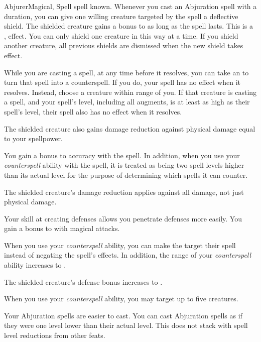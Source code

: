     \begin{feat}{Abjurer}{Magical, Spell}
        \featpre {} spell known.
        \featben
         Whenever you cast an Abjuration spell with a duration, you can give one willing creature targeted by the spell a deflective shield.
        The shielded creature gains a  bonus to  as long as the spell lasts.
        This is a ,  effect.
        You can only shield one creature in this way at a time.
        If you shield another creature, all previous shields are dismissed when the new shield takes effect.

         While you are casting a spell, at any time before it resolves, you can take an  to turn that spell into a counterspell.
        If you do, your spell has no effect when it resolves.
        Instead, choose a creature within \rngmed range of you.
        If that creature is casting a spell, and your spell's level, including all augments, is at least as high as their spell's level, their spell also has no effect when it resolves.

         The shielded creature also gains damage reduction against physical damage equal to your spellpower.

         You gain a  bonus to accuracy with the  spell.
        In addition, when you use your \textit{counterspell} ability with the  spell, it is treated as being two spell levels higher than its actual level for the purpose of determining which spells it can counter.

         The shielded creature's damage reduction applies against all damage, not just physical damage.

         Your skill at creating defenses allows you penetrate defenses more easily.
        You gain a  bonus to  with magical attacks.

         When you use your \textit{counterspell} ability, you can make the target  their spell instead of negating the spell's effects.
        In addition, the range of your \textit{counterspell} ability increases to \rnglong.

         The shielded creature's defense bonus increases to .

         When you use your \textit{counterspell} ability, you may target up to five creatures.

         Your Abjuration spells are easier to cast.
        You can cast Abjuration spells as if they were one level lower than their actual level.
        This does not stack with spell level reductions from other feats.
    \end{feat}


